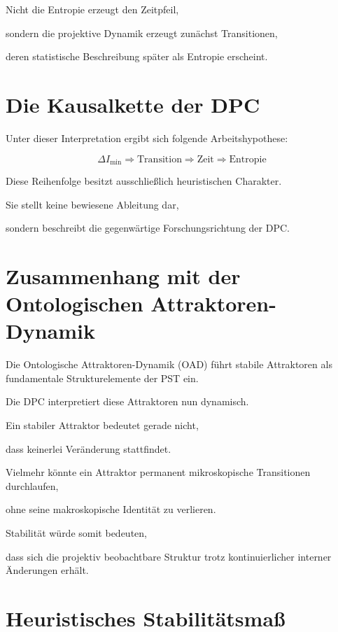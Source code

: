 \documentclass[11pt,a4paper]{article}
\begin{document}
Nicht die Entropie erzeugt den Zeitpfeil,

sondern die projektive Dynamik erzeugt zunächst
Transitionen,

deren statistische Beschreibung später
als Entropie erscheint.

\section{Die Kausalkette der DPC}

Unter dieser Interpretation ergibt sich folgende
Arbeitshypothese:

\[
\boxed{
\Delta I_{\min}
\Longrightarrow
\text{Transition}
\Longrightarrow
\text{Zeit}
\Longrightarrow
\text{Entropie}
}
\]

Diese Reihenfolge besitzt ausschließlich
heuristischen Charakter.

Sie stellt keine bewiesene Ableitung dar,

sondern beschreibt die gegenwärtige
Forschungsrichtung der DPC.

\section{Zusammenhang mit der Ontologischen Attraktoren-Dynamik}

Die Ontologische Attraktoren-Dynamik (OAD)
führt stabile Attraktoren als fundamentale
Strukturelemente der PST ein.

Die DPC interpretiert diese Attraktoren
nun dynamisch.

Ein stabiler Attraktor bedeutet gerade nicht,

dass keinerlei Veränderung stattfindet.

Vielmehr könnte ein Attraktor permanent
mikroskopische Transitionen durchlaufen,

ohne seine makroskopische Identität zu verlieren.

Stabilität würde somit bedeuten,

dass sich die projektiv beobachtbare Struktur
trotz kontinuierlicher interner Änderungen erhält.

\section{Heuristisches Stabilitätsmaß}
\end{document}

